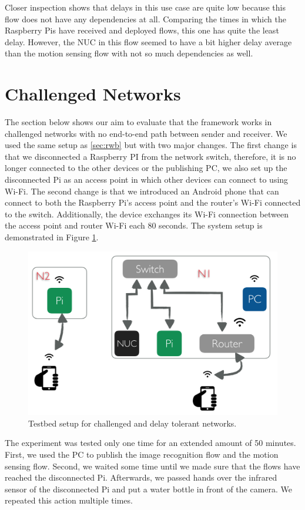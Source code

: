 \noindent Closer inspection shows that  delays in this use case are quite low because this flow does not have any dependencies at all. Comparing the times in which the Raspberry Pis have received and deployed flows, this one  has quite the least delay. However, the NUC in this flow seemed to have a bit higher delay average than the motion sensing flow with not so much dependencies as well.


\section{Challenged Networks}
The section below shows our aim to evaluate that the framework works in challenged networks with no end-to-end path between  sender and receiver. We used the same setup as \ref{sec:rwb} but with two major changes. The first change is that we disconnected  a Raspberry PI from the network switch, therefore, it is no longer connected to the other devices or the publishing PC, we also set up the disconnected Pi as an access point in which other devices can connect to using Wi-Fi. The second change is that we introduced an Android phone that can connect to both the Raspberry Pi's access point and the router's Wi-Fi connected to the switch. Additionally, the device exchanges  its Wi-Fi connection between the access point and router Wi-Fi each 80 seconds. The system setup is demonstrated in Figure \ref{fig:tb-dtn}.
\begin{figure}[H]
	\centering
	\includegraphics[scale=0.6]{images/tb-dtn.png}
	\caption{Testbed setup for challenged and delay tolerant networks.}
	\label{fig:tb-dtn}
\end{figure} 

\noindent The experiment was tested only one time for an extended amount of 50 minutes. First, we used the PC to publish the image recognition flow and the motion sensing flow. Second, we waited some time until we made sure that the flows have reached the disconnected Pi. Afterwards, we passed hands over the infrared sensor of the disconnected Pi and put a water bottle in front of the camera. We repeated this action multiple times.\\

